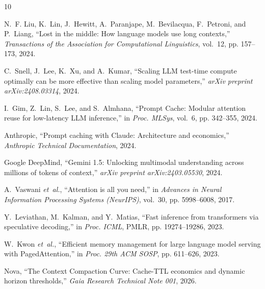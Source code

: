 \documentclass[10pt,twocolumn,a4paper]{article}
\begin{document}
\begin{thebibliography}{10}

N.~F. Liu, K.~Lin, J.~Hewitt, A.~Paranjape, M.~Bevilacqua, F.~Petroni, and P.~Liang,
``Lost in the middle: How language models use long contexts,''
\emph{Transactions of the Association for Computational Linguistics}, vol.~12, pp. 157--173, 2024.

C.~Snell, J.~Lee, K.~Xu, and A.~Kumar,
``Scaling LLM test-time compute optimally can be more effective than scaling model parameters,''
\emph{arXiv preprint arXiv:2408.03314}, 2024.

I.~Gim, Z.~Lin, S.~Lee, and S.~Almhana,
``Prompt Cache: Modular attention reuse for low-latency LLM inference,''
in \emph{Proc. MLSys}, vol.~6, pp. 342--355, 2024.

Anthropic,
``Prompt caching with Claude: Architecture and economics,''
\emph{Anthropic Technical Documentation}, 2024.

Google DeepMind,
``Gemini 1.5: Unlocking multimodal understanding across millions of tokens of context,''
\emph{arXiv preprint arXiv:2403.05530}, 2024.

A.~Vaswani \emph{et~al.},
``Attention is all you need,''
in \emph{Advances in Neural Information Processing Systems (NeurIPS)}, vol.~30, pp. 5998--6008, 2017.

Y.~Leviathan, M.~Kalman, and Y.~Matias,
``Fast inference from transformers via speculative decoding,''
in \emph{Proc. ICML}, PMLR, pp. 19274--19286, 2023.

W.~Kwon \emph{et~al.},
``Efficient memory management for large language model serving with PagedAttention,''
in \emph{Proc. 29th ACM SOSP}, pp. 611--626, 2023.

Nova,
``The Context Compaction Curve: Cache-TTL economics and dynamic horizon thresholds,''
\emph{Gaia Research Technical Note 001}, 2026.

\end{thebibliography}
\end{document}
